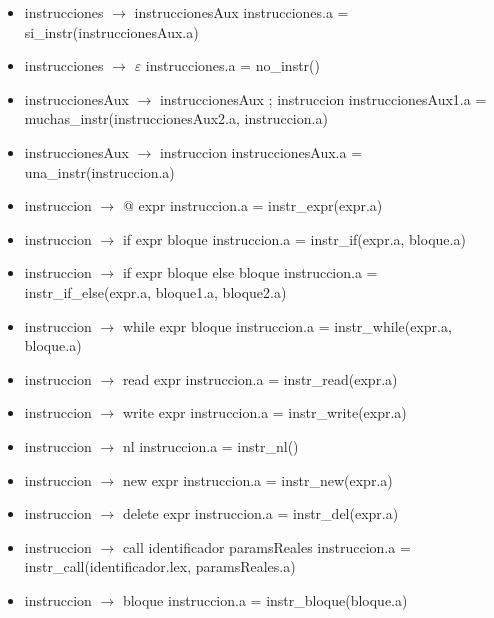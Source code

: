 \documentclass[11pt]{article}
\begin{document}
        \begin{itemize}
            \item instrucciones $\rightarrow$ instruccionesAux
                \subitem instrucciones.a = si\_instr(instruccionesAux.a)
            \item instrucciones $\rightarrow$ $\varepsilon$
                \subitem instrucciones.a = no\_instr()
            \item instruccionesAux $\rightarrow$ instruccionesAux ; instruccion
                \subitem instruccionesAux1.a = muchas\_instr(instruccionesAux2.a, instruccion.a)
            \item instruccionesAux $\rightarrow$ instruccion 
                \subitem instruccionesAux.a = una\_instr(instruccion.a)
            \item instruccion $\rightarrow$ @ expr
                \subitem instruccion.a = instr\_expr(expr.a)
            \item instruccion $\rightarrow$ if expr bloque 
                \subitem instruccion.a = instr\_if(expr.a, bloque.a)
            \item instruccion $\rightarrow$ if expr bloque else bloque
                \subitem instruccion.a = instr\_if\_else(expr.a, bloque1.a, bloque2.a)
            \item instruccion $\rightarrow$ while expr bloque
                \subitem instruccion.a = instr\_while(expr.a, bloque.a)
            \item instruccion $\rightarrow$ read expr
                \subitem instruccion.a = instr\_read(expr.a)
            \item instruccion $\rightarrow$ write expr 
                \subitem instruccion.a = instr\_write(expr.a)
            \item instruccion $\rightarrow$ nl
                \subitem instruccion.a = instr\_nl()
            \item instruccion $\rightarrow$ new expr
                \subitem instruccion.a = instr\_new(expr.a)
            \item instruccion $\rightarrow$ delete expr
                \subitem instruccion.a = instr\_del(expr.a)
            \item instruccion $\rightarrow$ call identificador paramsReales
                \subitem instruccion.a = instr\_call(identificador.lex, paramsReales.a)
            \item instruccion $\rightarrow$ bloque
                \subitem instruccion.a = instr\_bloque(bloque.a)

\end{itemize}
\end{document}
